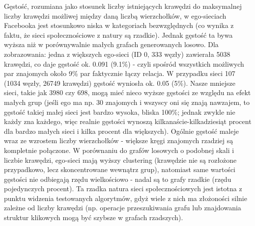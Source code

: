 Gęstość, rozumiana jako stosunek liczby istniejących krawędzi do maksymalnej liczby krawędzi możliwej między daną liczbą wierzchołków, w ego-sieciach Facebooka jest stosunkowo niska w kategoriach bezwzględnych (co wynika z faktu, że sieci społecznościowe z natury są rzadkie). Jednak gęstość ta bywa wyższa niż w porównywalnie małych grafach generowanych losowo. Dla zobrazowania: jedna z większych ego-sieci (ID 0, 333 węzły) zawierała 5038 krawędzi, co daje gęstość ok. 0.091 (9.1\%) - czyli spośród wszystkich możliwych par znajomych około 9\% par faktycznie łączy relacja. W przypadku sieci 107 (1034 węzły, 26749 krawędzi) gęstość wyniosła ok. 0.05 (5\%). Nasze mniejsze sieci, takie jak 3980 czy 698, mogą mieć nieco wyższe gęstości ze względu na efekt małych grup (jeśli ego ma np. 30 znajomych i wszyscy oni się znają nawzajem, to gęstość takiej małej sieci jest bardzo wysoka, bliska 100\%; jednak zwykle nie każdy zna każdego, więc realnie gęstości wynoszą kilkanaście-kilkadziesiąt procent dla bardzo małych sieci i kilka procent dla większych). Ogólnie gęstość maleje wraz ze wzrostem liczby wierzchołków - większe kręgi znajomych rzadziej są kompletnie połączone. W porównaniu do grafów losowych o podobnej skali i liczbie krawędzi, ego-sieci mają wyższy clustering (krawędzie nie są rozłożone przypadkowo, lecz skoncentrowane wewnątrz grup), natomiast same wartości gęstości nie odbiegają rzędu wielkościowo - nadal są to grafy rzadkie (rzędu pojedynczych procent). Ta rzadka natura sieci społecznościowych jest istotna z punktu widzenia testowanych algorytmów, gdyż wiele z nich ma złożoności silnie zależne od liczby krawędzi (np. operacje przeszukiwania grafu lub znajdowania struktur klikowych mogą być szybsze w grafach rzadszych).

